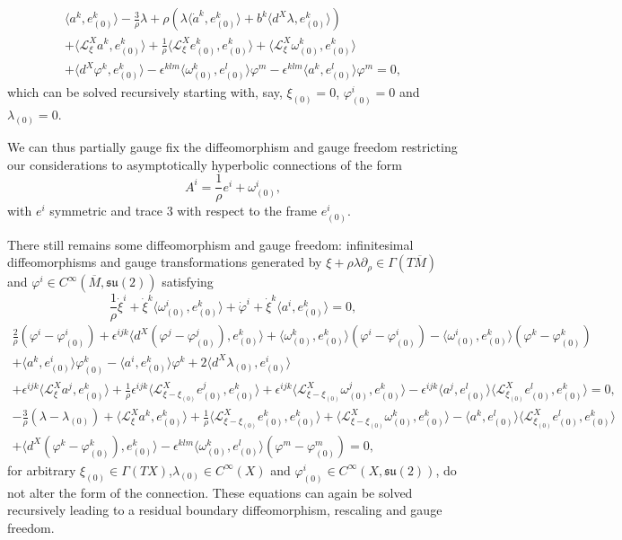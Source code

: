 \documentclass[a4paper,12pt]{article}
\newcommand{\cL}{{\mathcal L}}
\newcommand{\su}{\mathfrak {su}}
\begin{document}
\begin{multline*}
\langle a^k,e^k_{(0)}\rangle-\frac{3}{\rho}\lambda+\rho(\lambda\langle \dot a^k,e^k_{(0)}\rangle+b^k\langle d^X\lambda,e^k_{(0)}\rangle)
\\
+\langle\cL_\xi^Xa^k,e^k_{(0)}\rangle+\frac{1}{\rho}\langle \cL^X_{\xi}e^k_{(0)},e^k_{(0)}\rangle+\langle \cL^X_{\xi}\omega_{(0)}^k,e^k_{(0)}\rangle
\\
+\langle d^X\varphi^k,e^k_{(0)}\rangle-\epsilon^{klm}\langle \omega^k_{(0)},e^l_{(0)}\rangle\varphi^m-\epsilon^{klm}\langle a^k,e^l_{(0)}\rangle\varphi^m=0,
\end{multline*}
which can be solved recursively starting with, say, $\xi_{(0)}=0$, $\varphi_{(0)}^i=0$ and $\lambda_{(0)}=0$.


We can thus partially gauge fix the diffeomorphism and gauge freedom restricting our considerations to asymptotically hyperbolic connections of the form
$$A^i=\frac{1}{\rho}e^i+\omega^i_{(0)},$$
with $e^i$ symmetric and trace 3 with respect to the frame $e^i_{(0)}$.

There still remains some diffeomorphism and gauge freedom: infinitesimal diffeomorphisms and gauge transformations generated by $\xi+\rho\lambda\partial_\rho\in\Gamma(T\overline{M})$ and $\varphi^i\in C^\infty(\overline{M},\su(2))$ satisfying
$$\frac{1}{\rho}\dot \xi^i+\dot \xi^k\langle\omega^i_{(0)},e^k_{(0)}\rangle+\dot\varphi^i+\dot \xi^k\langle a^i,e^k_{(0)}\rangle=0,$$
\begin{multline*}
\frac{2}{\rho}(\varphi^i-\varphi_{(0)}^i)+\epsilon^{ijk}\langle d^X(\varphi^j-\varphi_{(0)}^j),e^k_{(0)}\rangle+\langle \omega^k_{(0)},e^k_{(0)}\rangle(\varphi^i-\varphi_{(0)}^i)-\langle \omega^i_{(0)},e^k_{(0)}\rangle(\varphi^k-\varphi_{(0)}^k)
\\
+\langle a^k,e^i_{(0)}\rangle\varphi^k_{(0)}-\langle a^i,e^k_{(0)}\rangle\varphi^k+2\langle d^X\lambda_{(0)},e^i_{(0)}\rangle
\\
+\epsilon^{ijk}\langle \cL_\xi^Xa^j,e^k_{(0)}\rangle+\frac{1}{\rho}\epsilon^{ijk}\langle \cL^X_{\xi-\xi_{(0)}}e^j_{(0)},e^k_{(0)}\rangle
+\epsilon^{ijk}\langle \cL^X_{\xi-\xi_{(0)}}\omega_{(0)}^j,e^k_{(0)}\rangle
-\epsilon^{ijk}\langle a^j,e^l_{(0)}\rangle\langle \cL^X_{\xi_{(0)}} e^l_{(0)},e^k_{(0)}\rangle=0,
\end{multline*}
\begin{multline*}
-\frac{3}{\rho}(\lambda-\lambda_{(0)})
+\langle\cL_\xi^Xa^k,e^k_{(0)}\rangle+\frac{1}{\rho}\langle \cL^X_{\xi-\xi_{(0)}}e^k_{(0)},e^k_{(0)}\rangle+\langle \cL^X_{\xi-\xi_{(0)}}\omega_{(0)}^k,e^k_{(0)}\rangle
-\langle a^k,e^l_{(0)}\rangle\langle \cL^X_{\xi_{(0)}} e^l_{(0)},e^k_{(0)}\rangle 
\\
+\langle d^X(\varphi^k-\varphi_{(0)}^k),e^k_{(0)}\rangle-\epsilon^{klm}\langle \omega^k_{(0)},e^l_{(0)}\rangle(\varphi^m-\varphi_{(0)}^m)=0,
\end{multline*}
for arbitrary $\xi_{(0)}\in\Gamma(TX)$,$\lambda_{(0)}\in C^\infty(X)$ and $\varphi^i_{(0)}\in C^\infty(X,\su(2))$, do not alter the form of the connection. These equations can again be solved recursively leading to a residual boundary diffeomorphism, rescaling and gauge freedom.
\end{document}
